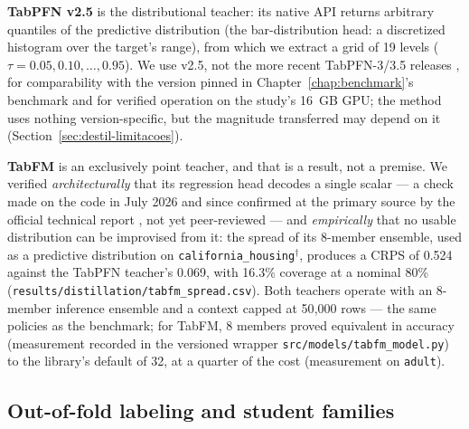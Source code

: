\textbf{TabPFN v2.5} \citep{hollmann2025,priorlabs2025} is the
distributional teacher: its native API returns arbitrary quantiles
of the predictive distribution (the bar-distribution head: a
discretized histogram over the target's range), from which we
extract a grid of 19 levels ($\tau = 0.05, 0.10, \ldots, 0.95$). We
use v2.5, not the more recent TabPFN-3/3.5 releases
\citep{tabpfn3-2026,tabpfn35tr2026}, for comparability with the
version pinned in Chapter~\ref{chap:benchmark}'s benchmark and for
verified operation on the study's 16~GB GPU; the method uses nothing
version-specific, but the magnitude transferred may depend on it
(Section~\ref{sec:destil-limitacoes}).

\textbf{TabFM} \citep{tabfm2026} is an exclusively point teacher,
and that is a result, not a premise. We verified
\emph{architecturally} that its regression head decodes a single
scalar --- a check made on the code in July 2026 and since confirmed
at the primary source by the official technical report
\citep{kong2026}, not yet peer-reviewed --- and \emph{empirically}
that no usable distribution can be improvised from it: the spread of
its 8-member ensemble, used as a predictive distribution on
\texttt{california\_\allowbreak housing}$^\dagger$, produces a CRPS
of 0.524 against the TabPFN teacher's 0.069, with 16.3\% coverage at
a nominal 80\%
(\texttt{results/\allowbreak distillation/\allowbreak tabfm\_\allowbreak spread.\allowbreak csv}).
Both teachers operate with an 8-member inference ensemble and a
context capped at 50{,}000 rows --- the same policies as the
benchmark; for TabFM, 8 members proved equivalent in accuracy
(measurement recorded in the versioned wrapper
\texttt{src/\allowbreak models/\allowbreak tabfm\_\allowbreak model.\allowbreak py})
to the library's default of 32, at a quarter of the cost
(measurement on \texttt{adult}).

\subsection{Out-of-fold labeling and student families}
\label{sec:destil-alunos}

